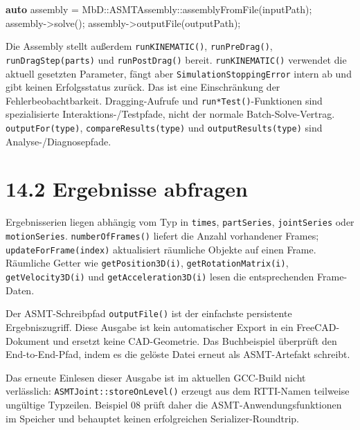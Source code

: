 \documentclass[
  12pt
]{book}
\newenvironment{Shaded}{}{}
\newcommand{\KeywordTok}[1]{\textcolor[rgb]{0.00,0.44,0.13}{\textbf{#1}}}
\newcommand{\NormalTok}[1]{#1}
\newcommand{\OperatorTok}[1]{\textcolor[rgb]{0.40,0.40,0.40}{#1}}
\begin{document}
\begin{Shaded}
\begin{Highlighting}[]
\KeywordTok{auto}\NormalTok{ assembly }\OperatorTok{=}\NormalTok{ MbD}\OperatorTok{::}\NormalTok{ASMTAssembly}\OperatorTok{::}\NormalTok{assemblyFromFile}\OperatorTok{(}\NormalTok{inputPath}\OperatorTok{);}
\NormalTok{assembly}\OperatorTok{{-}\textgreater{}}\NormalTok{solve}\OperatorTok{();}
\NormalTok{assembly}\OperatorTok{{-}\textgreater{}}\NormalTok{outputFile}\OperatorTok{(}\NormalTok{outputPath}\OperatorTok{);}
\end{Highlighting}
\end{Shaded}

Die Assembly stellt außerdem \texttt{runKINEMATIC()},
\texttt{runPreDrag()}, \texttt{runDragStep(parts)} und
\texttt{runPostDrag()} bereit. \texttt{runKINEMATIC()} verwendet die
aktuell gesetzten Parameter, fängt aber \texttt{SimulationStoppingError}
intern ab und gibt keinen Erfolgsstatus zurück. Das ist eine
Einschränkung der Fehlerbeobachtbarkeit. Dragging-Aufrufe und
\texttt{run*Test()}-Funktionen sind spezialisierte
Interaktions-/Testpfade, nicht der normale Batch-Solve-Vertrag.
\texttt{outputFor(type)}, \texttt{compareResults(type)} und
\texttt{outputResults(type)} sind Analyse-/Diagnosepfade.

\hypertarget{ergebnisse-abfragen}{%
\section{\texorpdfstring{{14.2} Ergebnisse
abfragen}{14.2 Ergebnisse abfragen}}\label{ergebnisse-abfragen}}

Ergebnisserien liegen abhängig vom Typ in \texttt{times},
\texttt{partSeries}, \texttt{jointSeries} oder \texttt{motionSeries}.
\texttt{numberOfFrames()} liefert die Anzahl vorhandener Frames;
\texttt{updateForFrame(index)} aktualisiert räumliche Objekte auf einen
Frame. Räumliche Getter wie \texttt{getPosition3D(i)},
\texttt{getRotationMatrix(i)}, \texttt{getVelocity3D(i)} und
\texttt{getAcceleration3D(i)} lesen die entsprechenden Frame-Daten.

Der ASMT-Schreibpfad \texttt{outputFile()} ist der einfachste
persistente Ergebniszugriff. Diese Ausgabe ist kein automatischer Export
in ein FreeCAD-Dokument und ersetzt keine CAD-Geometrie. Das
Buchbeispiel überprüft den End-to-End-Pfad, indem es die gelöste Datei
erneut als ASMT-Artefakt schreibt.

Das erneute Einlesen dieser Ausgabe ist im aktuellen GCC-Build nicht
verlässlich: \texttt{ASMTJoint::storeOnLevel()} erzeugt aus dem
RTTI-Namen teilweise ungültige Typzeilen. Beispiel 08 prüft daher die
ASMT-Anwendungsfunktionen im Speicher und behauptet keinen erfolgreichen
Serializer-Roundtrip.
\end{document}
